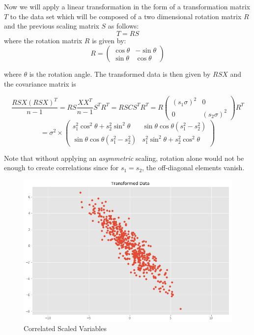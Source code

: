 Now we will apply a linear transformation in the form of a transformation matrix $T$ to the data set which will be composed of a two dimensional rotation matrix $R$ and the previous scaling matrix $S$ as follows: $$T = RS$$ where the rotation matrix $R$ is given by:
$$R = \left( \begin{array}{ccc}  \cos\theta  & -\sin\theta  \\  \sin\theta  & \cos\theta  \end{array} \right)$$

where $\theta$ is the rotation angle. The transformed data is then given by $RSX$ and the covariance matrix is


$$\frac{RSX(RSX)^T}{n-1}=RS\frac{XX^T}{n-1}S^TR^T=RSCS^TR^T=R\left( \begin{array}{ccc}  (s_{1}\sigma)^2 & 0 \\  0 & (s_{2}\sigma)^2 \end{array} \right)R^T$$
$$=\sigma^2 \times \left( \begin{array}{ccc}  s^2_{1}\cos^2\theta +s^2_{2}\sin^2\theta  & \sin\theta \cos\theta (s^2_{1}- s^2_{2})\\  \sin\theta \cos\theta (s^2_{1}- s^2_{2}) & s^2_{1}\sin^2\theta +s^2_{2}\cos^2\theta  \end{array} \right)$$

Note that without applying an \emph{asymmetric} scaling, rotation alone would not be enough to create correlations since for $s_{1}= s_{2}$, the off-diagonal elements vanish.
\begin{figure}[h!]
  \centering
    \includegraphics[scale=0.3]{correlated.png}
   \caption{Correlated Scaled Variables}
\end{figure}

